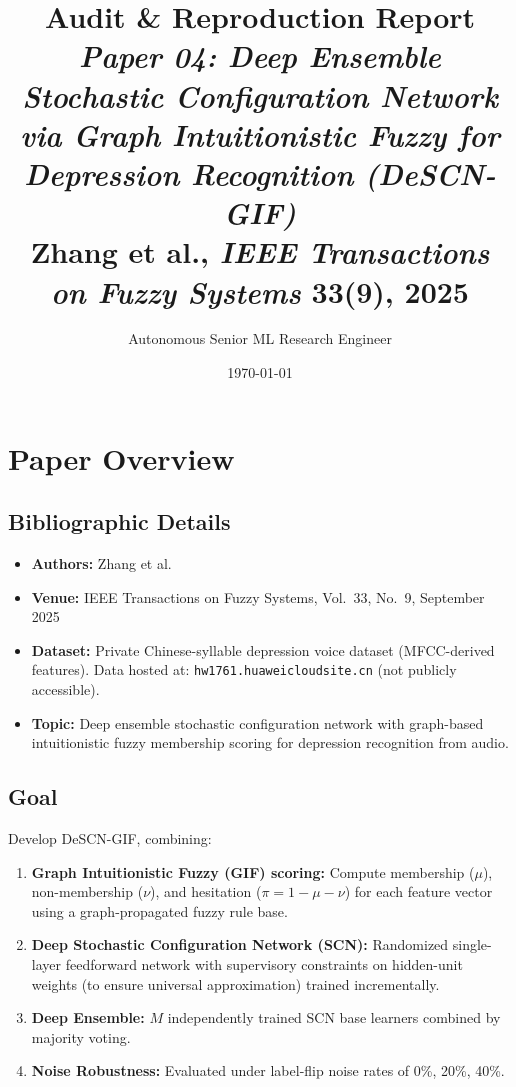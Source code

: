 \documentclass[12pt,a4paper]{article}
\title{\textbf{Audit \& Reproduction Report}\\[0.4em]
\large\textit{Paper 04: Deep Ensemble Stochastic Configuration Network via Graph Intuitionistic Fuzzy for Depression Recognition (DeSCN-GIF)}\\[0.3em]
Zhang et al., \textit{IEEE Transactions on Fuzzy Systems} 33(9), 2025}
\author{Autonomous Senior ML Research Engineer}
\date{\today}
\begin{document}
\maketitle
\tableofcontents
\newpage

\section{Paper Overview}
\subsection{Bibliographic Details}
\begin{itemize}[leftmargin=*]
  \item \textbf{Authors:} Zhang et al.
  \item \textbf{Venue:} IEEE Transactions on Fuzzy Systems, Vol.~33, No.~9, September 2025
  \item \textbf{Dataset:} Private Chinese-syllable depression voice dataset (MFCC-derived features). Data hosted at: \texttt{hw1761.huaweicloudsite.cn} (not publicly accessible).
  \item \textbf{Topic:} Deep ensemble stochastic configuration network with graph-based intuitionistic fuzzy membership scoring for depression recognition from audio.
\end{itemize}

\subsection{Goal}
Develop DeSCN-GIF, combining:
\begin{enumerate}[leftmargin=*]
  \item \textbf{Graph Intuitionistic Fuzzy (GIF) scoring:} Compute membership ($\mu$), non-membership ($\nu$), and hesitation ($\pi = 1 - \mu - \nu$) for each feature vector using a graph-propagated fuzzy rule base.
  \item \textbf{Deep Stochastic Configuration Network (SCN):} Randomized single-layer feedforward network with supervisory constraints on hidden-unit weights (to ensure universal approximation) trained incrementally.
  \item \textbf{Deep Ensemble:} $M$ independently trained SCN base learners combined by majority voting.
  \item \textbf{Noise Robustness:} Evaluated under label-flip noise rates of 0\%, 20\%, 40\%.
\end{enumerate}
\end{document}
